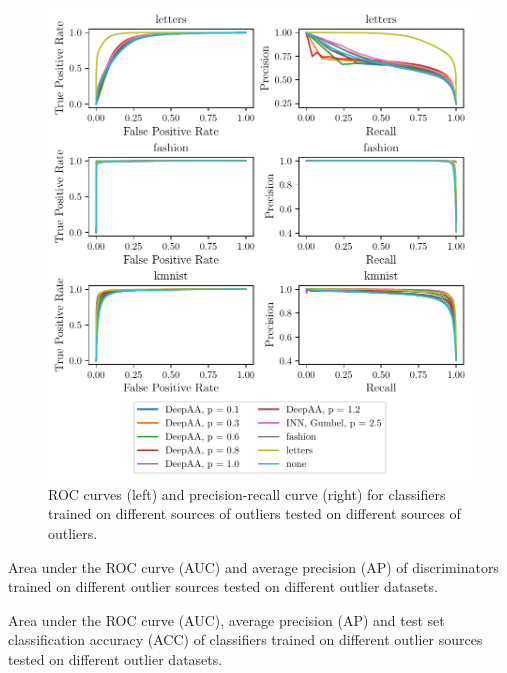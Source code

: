 \begin{figure}[htpb]
    \centering
    \includegraphics{figures/samples/emnist_class_curve.pdf}
    \caption{ROC curves (left) and precision-recall curve (right) for
    classifiers trained on different sources of outliers tested on different
    sources of outliers.}%
    \label{fig:emnist_stat_class}
\end{figure}

\begin{table}[htpb]
	\centering
        \caption{Area under the ROC curve (AUC) and average precision (AP) of
        discriminators trained on different outlier sources tested on different
        outlier datasets.}%
	\label{tab:emnist_disc}
	
\end{table}

\begin{table}[htpb]
	\centering
        \caption{Area under the ROC curve (AUC), average precision (AP) and
        test set classification accuracy (ACC) of classifiers trained on
        different outlier sources tested on different outlier datasets.}%
	\label{tab:emnist_class}
	
\end{table}

